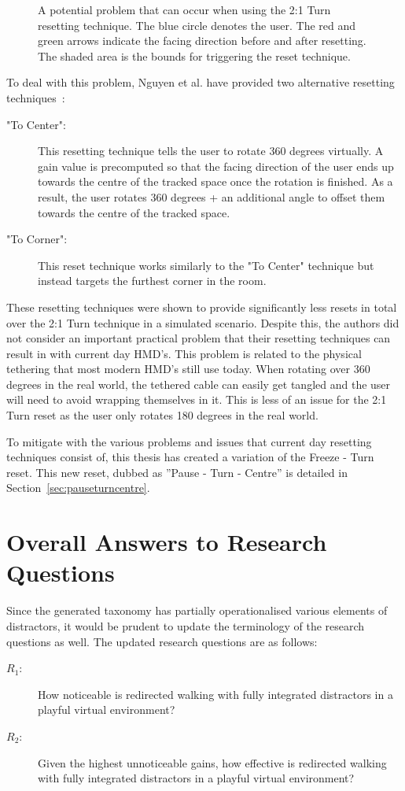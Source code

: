 \begin{figure}[htbp]
  \centering
  
  \caption[Potential Problem With 2:1 Turn Resetting]{A potential problem that can occur when using the 2:1 Turn resetting technique. The blue circle denotes the user. The red and green arrows indicate the facing direction before and after resetting. The shaded area is the bounds for triggering the reset technique.}
  \label{fig:2to1turnProblem}
\end{figure}

To deal with this problem, Nguyen et al. have provided two alternative resetting techniques~\cite{nguyen2018discrete}:

\begin{description}
   \item["To Center": ] This resetting technique tells the user to rotate 360 degrees virtually. A gain value is precomputed so that the facing direction of the user ends up towards the centre of the tracked space once the rotation is finished. As a result, the user rotates 360 degrees + an additional angle to offset them towards the centre of the tracked space.
   \item["To Corner": ] This reset technique works similarly to the "To Center" technique but instead targets the furthest corner in the room. 
\end{description}

These resetting techniques were shown to provide significantly less resets in total over the 2:1 Turn technique in a simulated scenario. Despite this, the authors did not consider an important practical problem that their resetting techniques can result in with current day HMD's. This problem is related to the physical tethering that most modern HMD's still use today. When rotating over 360 degrees in the real world, the tethered cable can easily get tangled and the user will need to avoid wrapping themselves in it. This is less of an issue for the 2:1 Turn reset as the user only rotates 180 degrees in the real world. 

To mitigate with the various problems and issues that current day resetting techniques consist of, this thesis has created a variation of the Freeze - Turn reset. This new reset, dubbed as ''Pause - Turn - Centre'' is detailed in Section~\ref{sec:pauseturncentre}.

\section{Overall Answers to Research Questions}
Since the generated taxonomy has partially operationalised various elements of distractors, it would be prudent to update the terminology of the research questions as well. 
The updated research questions are as follows: 
\begin{description}
   \item[$R_1$: ] How noticeable is redirected walking with fully integrated distractors in a playful virtual environment?
   \item[$R_2$: ] Given the highest unnoticeable gains, how effective is redirected walking with fully integrated distractors in a playful virtual environment?
\end{description}

